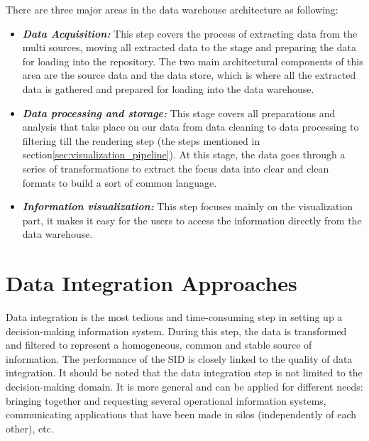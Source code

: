 There are three major areas in the data warehouse architecture as following:
\begin{itemize}
  \renewcommand{\labelitemi}{$\bullet$}
  \item \textbf{\textit{Data Acquisition:}} This step covers the process of extracting data from the multi sources, moving all extracted data to the stage and preparing the data for loading into the repository. The two main architectural components of this area are the source data and the data store, which is where all the extracted data is gathered and prepared for loading into the data warehouse.
  
  \item \textbf{\textit{Data processing and storage:}} This stage covers all preparations and analysis that take place on our data from data cleaning to data processing to filtering till the rendering step (the steps mentioned in section\ref{sec:visualization_pipeline}).
  At this stage, the data goes through a series of transformations to extract the focus data into clear and clean formats to build a sort of common language.

  \item \textbf{\textit{Information visualization:}} This step focuses mainly on the visualization part, it makes it easy for the users to access the information directly from the data warehouse.
\end{itemize}



\newpage
\section{Data Integration Approaches} 
Data integration is the most tedious and time-consuming step in setting up a decision-making information system. During this step, the data is transformed and filtered to represent a homogeneous, common and stable source of information. The performance of the SID is closely linked to the quality of data integration. It should be noted that the data integration step is not limited to the decision-making domain. It is more general and can be applied for different needs: bringing together and requesting several operational information systems, communicating applications that have been made in silos (independently of each other), etc.
 
